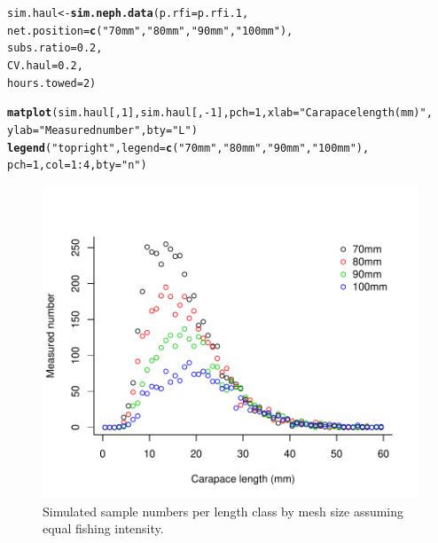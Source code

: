 \documentclass[12pt]{article}\usepackage[]{graphicx}\usepackage[]{color}
\makeatletter
\def\maxwidth{ %
  \ifdim\Gin@nat@width>\linewidth
    \linewidth
  \else
    \Gin@nat@width
  \fi
}
\newcommand{\hlnum}[1]{\textcolor[rgb]{0.686,0.059,0.569}{#1}}%
\newcommand{\hlstr}[1]{\textcolor[rgb]{0.192,0.494,0.8}{#1}}%
\newcommand{\hlopt}[1]{\textcolor[rgb]{0,0,0}{#1}}%
\newcommand{\hlstd}[1]{\textcolor[rgb]{0.345,0.345,0.345}{#1}}%
\newcommand{\hlkwb}[1]{\textcolor[rgb]{0.69,0.353,0.396}{#1}}%
\newcommand{\hlkwc}[1]{\textcolor[rgb]{0.333,0.667,0.333}{#1}}%
\newcommand{\hlkwd}[1]{\textcolor[rgb]{0.737,0.353,0.396}{\textbf{#1}}}%
\newenvironment{kframe}{%
 \def\at@end@of@kframe{}%
 \ifinner\ifhmode%
  \def\at@end@of@kframe{\end{minipage}}%
  \begin{minipage}{\columnwidth}%
 \fi\fi%
 \def\FrameCommand##1{\hskip\@totalleftmargin \hskip-\fboxsep
 \colorbox{shadecolor}{##1}\hskip-\fboxsep
     \hskip-\linewidth \hskip-\@totalleftmargin \hskip\columnwidth}%
 \MakeFramed {\advance\hsize-\width
   \@totalleftmargin\z@ \linewidth\hsize
   \@setminipage}}%
 {\par\unskip\endMakeFramed%
 \at@end@of@kframe}
\newenvironment{knitrout}{}{} %
\makeatother
\begin{document}
\begin{knitrout}\footnotesize
{}\color{fgcolor}\begin{kframe}
\begin{alltt}
\hlstd{sim.haul} \hlkwb{<-} \hlkwd{sim.neph.data}\hlstd{(}\hlkwc{p.rfi} \hlstd{= p.rfi.1,}
                          \hlkwc{net.position} \hlstd{=} \hlkwd{c}\hlstd{(}\hlstr{"70mm"}\hlstd{,} \hlstr{"80mm"}\hlstd{,} \hlstr{"90mm"}\hlstd{,} \hlstr{"100mm"}\hlstd{),}
                          \hlkwc{subs.ratio} \hlstd{=} \hlnum{0.2}\hlstd{,}
                          \hlkwc{CV.haul} \hlstd{=} \hlnum{0.2}\hlstd{,}
                          \hlkwc{hours.towed} \hlstd{=} \hlnum{2}\hlstd{)}

\hlkwd{matplot}\hlstd{(sim.haul[,}\hlnum{1}\hlstd{], sim.haul[,} \hlopt{-}\hlnum{1}\hlstd{],} \hlkwc{pch} \hlstd{=} \hlnum{1}\hlstd{,} \hlkwc{xlab} \hlstd{=} \hlstr{"Carapace length (mm)"}\hlstd{,}
        \hlkwc{ylab} \hlstd{=} \hlstr{"Measured number"}\hlstd{,} \hlkwc{bty} \hlstd{=} \hlstr{"L"}\hlstd{)}
\hlkwd{legend}\hlstd{(}\hlstr{"topright"}\hlstd{,} \hlkwc{legend} \hlstd{=} \hlkwd{c}\hlstd{(}\hlstr{"70mm"}\hlstd{,} \hlstr{"80mm"}\hlstd{,} \hlstr{"90mm"}\hlstd{,} \hlstr{"100mm"}\hlstd{),}
       \hlkwc{pch} \hlstd{=} \hlnum{1}\hlstd{,} \hlkwc{col} \hlstd{=} \hlnum{1}\hlopt{:}\hlnum{4}\hlstd{,} \hlkwc{bty} \hlstd{=} \hlstr{"n"}\hlstd{)}
\end{alltt}
\end{kframe}\begin{figure}

{\centering \includegraphics[width=\maxwidth]{figure/exsim-1} 

}

\caption[Simulated sample numbers per length class by mesh size assuming equal fishing intensity]{Simulated sample numbers per length class by mesh size assuming equal fishing intensity.}\label{fig:exsim}
\end{figure}


\end{knitrout}
\end{document}
